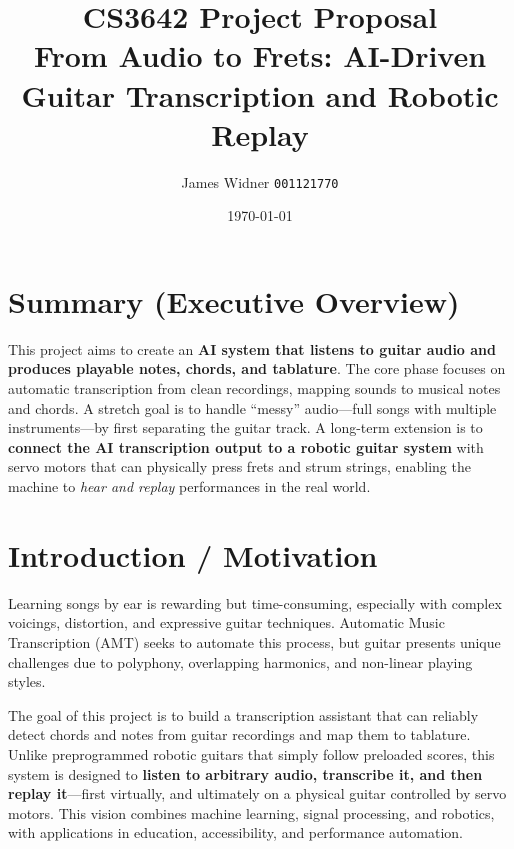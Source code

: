 \documentclass[11pt]{article}
\title{CS3642 Project Proposal\\[4pt]
\large From Audio to Frets: AI-Driven Guitar Transcription and Robotic Replay}
\author{James Widner \quad \texttt{001121770}}
\date{\today}
\begin{document}
\maketitle

\section*{Summary (Executive Overview)}
This project aims to create an \textbf{AI system that listens to guitar audio and produces playable notes, chords, and tablature}. The core phase focuses on automatic transcription from clean recordings, mapping sounds to musical notes and chords. A stretch goal is to handle ``messy'' audio---full songs with multiple instruments---by first separating the guitar track. A long-term extension is to \textbf{connect the AI transcription output to a robotic guitar system} with servo motors that can physically press frets and strum strings, enabling the machine to \emph{hear and replay} performances in the real world.

\section*{Introduction / Motivation}
Learning songs by ear is rewarding but time-consuming, especially with complex voicings, distortion, and expressive guitar techniques. Automatic Music Transcription (AMT) seeks to automate this process, but guitar presents unique challenges due to polyphony, overlapping harmonics, and non-linear playing styles.

The goal of this project is to build a transcription assistant that can reliably detect chords and notes from guitar recordings and map them to tablature. Unlike preprogrammed robotic guitars that simply follow preloaded scores, this system is designed to \textbf{listen to arbitrary audio, transcribe it, and then replay it}---first virtually, and ultimately on a physical guitar controlled by servo motors. This vision combines machine learning, signal processing, and robotics, with applications in education, accessibility, and performance automation.
\end{document}
